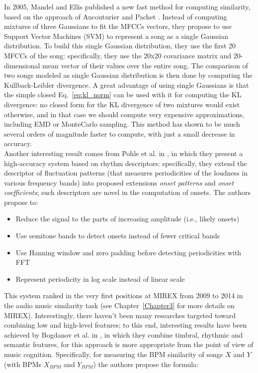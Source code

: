 In 2005, Mandel and Ellis published a new fast method for computing similarity, based on the approach of Aucouturier and Pachet \cite{mandel05}. Instead of computing mixtures of three Gaussians to fit the MFCCs vectors, they propose to use Support Vector Machines (SVM) to represent a song as a single Gaussian distribution. To build this single Gaussian distribution, they use the first 20 MFCCs of the song: specifically, they use the 20x20 covariance matrix and 20-dimensional mean vector of their values over the entire song. The comparison of two songs modeled as single Gaussian distribution is then done by computing the Kullback-Leibler divergence. A great advantage of using single Gaussians is that the simple closed Eq.~\ref{eq:kl_norm} can be used with it for computing the KL divergence: no closed form for the KL divergence of two mixtures would exist otherwise, and in that case we should compute very expensive approximations, including EMD or MonteCarlo sampling. This method has shown to be much several orders of magnitude faster to compute, with just a small decrease in accuracy. \\ Another interesting result comes from Pohle et al. in \cite{pohle09}, in which they present a high-accuracy system based on rhythm descriptors: specifically, they extend the descriptor of fluctuation patterns (that measures periodicities of the loudness in various frequency bands) into proposed extensions \textit{onset patterns} and \textit{onset coefficients}; such descriptors are novel in the computation of onsets. The authors propose to: 
\begin{itemize}
\item Reduce the signal to the parts of increasing amplitude (i.e., likely onsets)
\item Use semitone bands to detect onsets instead of fewer critical bands
\item Use Hanning window and zero padding before detecting periodicities with FFT
\item Represent periodicity in log scale instead of linear scale
\end{itemize}
This system ranked in the very first positions at MIREX from 2009 to 2014 in the audio music similarity task (see Chapter~\ref{Chapter3} for more details on MIREX).  
Interestingly, there haven't been many researches targeted toward combining low and high-level features; to this end, interesting results have been achieved by Bogdanov et al. in \cite{dimi10}, in which they combine timbral, rhythmic and semantic features, for this approach is more appropriate from the point of view of music cognition. Specifically, for measuring the BPM similarity of songs $X$ and $Y$ (with BPMs $X_{BPM}$ and $Y_{BPM}$) the authors propose the formula:
